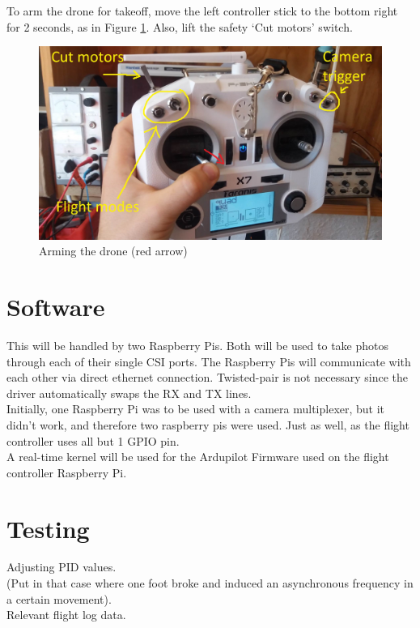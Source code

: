 To arm the drone for takeoff, move the left controller stick to the bottom right for 2 seconds, as in Figure \ref{fig:taranis_arm}. Also, lift the safety `Cut motors' switch.

\begin{figure}[H]
\centering
\includegraphics[scale=0.17]{images/taranis_arm.jpg}
\caption{Arming the drone (red arrow)}
\label{fig:taranis_arm}
\end{figure}

\section{Software}

This will be handled by two Raspberry Pis. Both will be used to take photos through each of their single CSI ports. The Raspberry Pis will communicate with each other via direct ethernet connection. Twisted-pair is not necessary since the driver automatically swaps the RX and TX lines.\\

Initially, one Raspberry Pi was to be used with a camera multiplexer, but it didn't work, and therefore two raspberry pis were used. Just as well, as the flight controller uses all but 1 GPIO pin.\\

A real-time kernel will be used for the Ardupilot Firmware used on the flight controller Raspberry Pi.\\

\section{Testing}

Adjusting PID values.\\

(Put in that case where one foot broke and induced an asynchronous frequency in a certain movement).\\

Relevant flight log data.